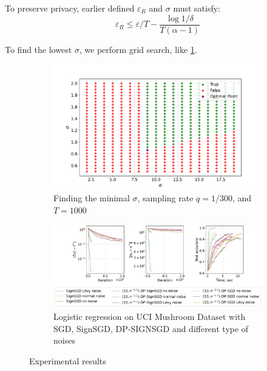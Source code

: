 \documentclass[a4paper, 12pt]{article}
\newcommand{\eps}{\varepsilon}
\begin{document}
To preserve privacy, earlier defined $\eps_R$ and $\sigma$ must satisfy:
\begin{equation}\label{eq:renyi_eps_requirement}
\eps_R \leq \eps/T - \frac{\log 1/\delta}{T(\alpha - 1)}
\end{equation}

To find the lowest $\sigma$, we perform grid search, like \ref{fig:grid_sigma}.
\begin{figure}[h]
    \centering
    \begin{subfigure}[b]{0.39\textwidth}
        \centering
        \includegraphics[width=\textwidth]{grid_sigma_to_pres.pdf}
        \caption{Finding the minimal $\sigma$, sampling rate $q = 1/300$, and $T = 1000$}
        \label{fig:grid_sigma}
    \end{subfigure}
    \hfill
    \begin{subfigure}[b]{0.6\textwidth}
        \centering
        \includegraphics[width=\textwidth]{v28_constant_step/short/v28_constant_step_short.pdf}
        \caption{Logistic regression on UCI Mushroom Dataset with SGD, SignSGD, {\scriptsize DP-SIGN}SGD and different type of noises}
        \label{fig:logreg}
    \end{subfigure}
    \caption{Experimental results}
\end{figure}
\end{document}
